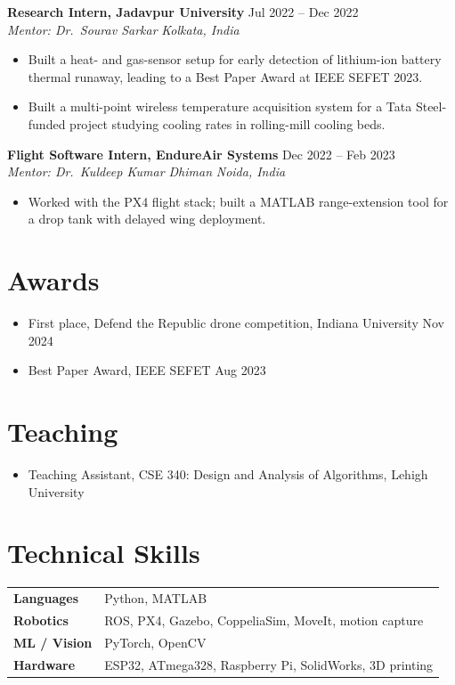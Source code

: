 \documentclass[10pt,letterpaper]{article}
\newcommand{\entry}[4]{%
  \textbf{#1} \hfill #2 \\
  \textit{#3} \hfill \textit{#4}\par\vspace{1pt}}
\begin{document}
\entry{Research Intern, Jadavpur University}{Jul 2022 -- Dec 2022}
      {Mentor: Dr.\ Sourav Sarkar}{Kolkata, India}
\begin{itemize}
  \item Built a heat- and gas-sensor setup for early detection of lithium-ion battery thermal runaway,
        leading to a Best Paper Award at IEEE SEFET 2023.
  \item Built a multi-point wireless temperature acquisition system for a Tata Steel-funded project
        studying cooling rates in rolling-mill cooling beds.
\end{itemize}

\entry{Flight Software Intern, EndureAir Systems}{Dec 2022 -- Feb 2023}
      {Mentor: Dr.\ Kuldeep Kumar Dhiman}{Noida, India}
\begin{itemize}
  \item Worked with the PX4 flight stack; built a MATLAB range-extension tool for a drop tank with delayed wing deployment.
\end{itemize}

\section{Awards}
\begin{itemize}
  \item First place, Defend the Republic drone competition, Indiana University \hfill Nov 2024
  \item Best Paper Award, IEEE SEFET \hfill Aug 2023
\end{itemize}

\section{Teaching}
\begin{itemize}
  \item Teaching Assistant, CSE 340: Design and Analysis of Algorithms, Lehigh University
\end{itemize}

\section{Technical Skills}
\begin{tabularx}{\textwidth}{@{}l X@{}}
  \textbf{Languages}   & Python, MATLAB \\
  \textbf{Robotics}    & ROS, PX4, Gazebo, CoppeliaSim, MoveIt, motion capture \\
  \textbf{ML / Vision} & PyTorch, OpenCV \\
  \textbf{Hardware}    & ESP32, ATmega328, Raspberry Pi, SolidWorks, 3D printing \\
\end{tabularx}
\end{document}
